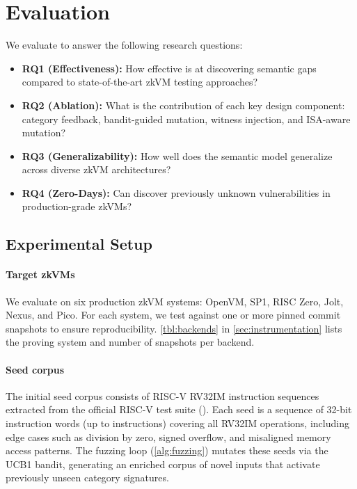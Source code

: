 \section{Evaluation}\label{sec:eval}

We evaluate \tool to answer the following research questions:
\begin{itemize}
    \item \textbf{RQ1 (Effectiveness):} How effective is \tool at discovering semantic gaps compared to state-of-the-art zkVM testing approaches?
    \item \textbf{RQ2 (Ablation):} What is the contribution of each key design component: category feedback, bandit-guided mutation, witness injection, and ISA-aware mutation?
    \item \textbf{RQ3 (Generalizability):} How well does the semantic model generalize across diverse zkVM architectures?
    \item \textbf{RQ4 (Zero-Days):} Can \tool discover previously unknown vulnerabilities in production-grade zkVMs?
\end{itemize}

\subsection{Experimental Setup}\label{sec:eval-setup}

\paragraph{Target zkVMs}
We evaluate \tool on six production zkVM systems: OpenVM, SP1, RISC Zero, Jolt, Nexus, and Pico. For each system, we test against one or more pinned commit snapshots to ensure reproducibility. \autoref{tbl:backends} in \autoref{sec:instrumentation} lists the proving system and number of snapshots per backend.

\paragraph{Seed corpus}
The initial seed corpus consists of  RISC-V RV32IM instruction sequences extracted from the official RISC-V test suite (). Each seed is a sequence of 32-bit instruction words (up to  instructions) covering all RV32IM operations, including edge cases such as division by zero, signed overflow, and misaligned memory access patterns. The fuzzing loop (\autoref{alg:fuzzing}) mutates these seeds via the UCB1 bandit, generating an enriched corpus of novel inputs that activate previously unseen category signatures.

